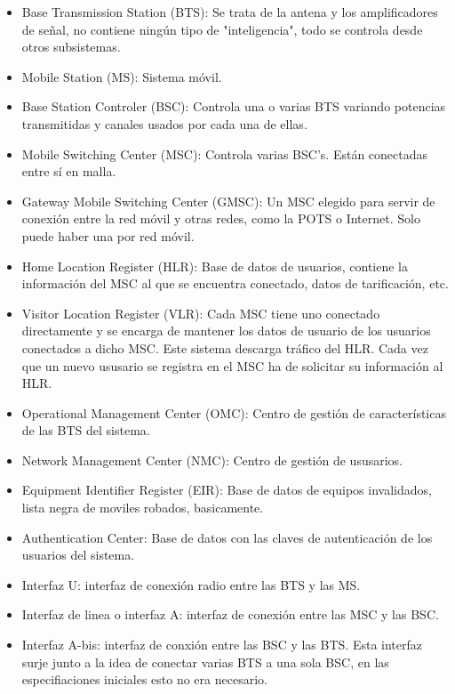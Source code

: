 \begin{itemize}
	\item Base Transmission Station (BTS): Se trata de la antena y los amplificadores de señal, no contiene ningún tipo de "inteligencia", todo se controla desde otros subsistemas.
	\item Mobile Station (MS): Sistema móvil.
	\item Base Station Controler (BSC): Controla una o varias BTS variando potencias transmitidas y canales usados por cada una de ellas.
	\item Mobile Switching Center (MSC): Controla varias BSC's. Están conectadas entre sí en malla.
	\item Gateway Mobile Switching Center (GMSC): Un MSC elegido para servir de conexión entre la red móvil y otras redes, como la POTS o Internet. Solo puede haber una por red móvil.
	\item Home Location Register (HLR): Base de datos de usuarios, contiene la información del MSC al que se encuentra conectado, datos de tarificación, etc.
	\item Visitor Location Register (VLR): Cada MSC tiene uno conectado directamente y se encarga de mantener los datos de usuario de los usuarios conectados a dicho MSC. Este sistema descarga tráfico del HLR. Cada vez que un nuevo ususario se registra en el MSC ha de solicitar su información al HLR.
	\item Operational Management Center (OMC): Centro de gestión de características de las BTS  del sistema.
	\item Network Management Center (NMC): Centro de gestión de ususarios.
	\item Equipment Identifier Register (EIR): Base de datos de equipos invalidados, lista negra de moviles robados, basicamente.
	\item Authentication Center: Base de datos con las claves de autenticación de los usuarios del sistema.
	\item Interfaz U: interfaz de conexión radio entre las BTS y las MS.
	\item Interfaz de linea o interfaz A: interfaz de conexión entre las MSC y las BSC.
	\item Interfaz A-bis: interfaz de conxión entre las BSC y las BTS. Esta interfaz surje junto a la idea de conectar varias BTS a una sola BSC, en las especifiaciones iniciales esto no era necesario.
\end{itemize}
